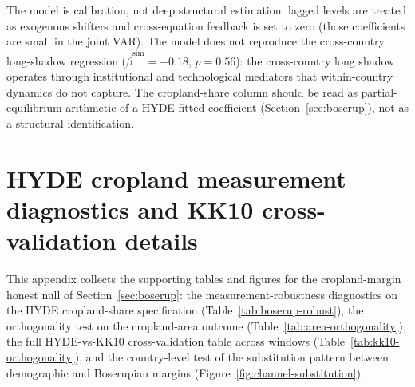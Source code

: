 \documentclass[11pt,letterpaper]{article}
\begin{document}
The model is calibration, not deep structural estimation: lagged levels are treated as exogenous shifters and cross-equation feedback is set to zero (those coefficients are small in the joint VAR). The model does not reproduce the cross-country long-shadow regression ($\hat\beta^{\text{sim}}=+0.18$, $p=0.56$): the cross-country long shadow operates through institutional and technological mediators that within-country dynamics do not capture. The cropland-share column should be read as partial-equilibrium arithmetic of a HYDE-fitted coefficient (Section~\ref{sec:boserup}), not as a structural identification.

\section{HYDE cropland measurement diagnostics and KK10 cross-validation details}
\label{app:cropland-diagnostics}

This appendix collects the supporting tables and figures for the cropland-margin honest null of Section~\ref{sec:boserup}: the measurement-robustness diagnostics on the HYDE cropland-share specification (Table~\ref{tab:boserup-robust}), the orthogonality test on the cropland-area outcome (Table~\ref{tab:area-orthogonality}), the full HYDE-vs-KK10 cross-validation table across windows (Table~\ref{tab:kk10-orthogonality}), and the country-level test of the substitution pattern between demographic and Boserupian margins (Figure~\ref{fig:channel-substitution}).
\end{document}
